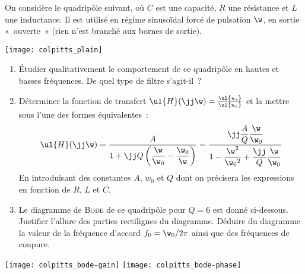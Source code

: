 \documentclass[a4paper, 12pt, final, garamond]{book}
\begin{document}
\begin{minipage}{.50\linewidth}
    On considère le quadripôle suivant, où $C$ est une capacité, $R$ une
    résistance et $L$ une inductance. Il est utilisé en régime sinusoïdal forcé
    de pulsation $\w$, en sortie «~ouverte~» (rien n'est branché aux bornes de
    sortie).
\end{minipage}
\begin{minipage}{0.50\linewidth}
    \begin{center}
        \texttt{[image: colpitts\_plain]}
    \end{center}
\end{minipage}
\begin{enumerate}
    \item Étudier qualitativement le comportement de ce quadripôle en hautes et
        basses fréquences. De quel type de filtre s'agit-il~?
    \item Déterminer la fonction de transfert $\ul{H}(\jj\w) =
        \frac{\ul{u_s}}{\ul{u_e}}$ et la mettre sous l'une des formes
        équivalentes~:
        \[\ul{H}(\jj\w) = \frac{A}{1+\jj Q \left( \dfrac{\w}{\w_0} -
            \dfrac{\w_0}{\w} \right)} = \frac{\jj\dfrac{A}{Q}\dfrac{\w}{\w_0}}{1
    - \dfrac{\w^2}{\w_0{}^2} + \dfrac{\jj}{Q} \dfrac{\w}{\w_0}}\]
        En introduisant des constantes $A$, $w_0$ et $Q$ dont on précisera les
        expressions en fonction de $R$, $L$ et $C$.
    \item Le diagramme de \textsc{Bode} de ce quadripôle pour $Q = 6$ est donné
        ci-dessous. Justifier l'allure des parties rectilignes du diagramme.
        Déduire du diagramme la valeur de la fréquence d'accord $f_0 =
        \w_0/2\pi$ ainsi que des fréquences de coupure.
\end{enumerate}
\begin{center}
    \texttt{[image: colpitts\_bode-gain]}
    \texttt{[image: colpitts\_bode-phase]}
\end{center}
\end{document}
